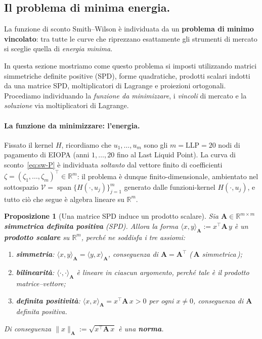 \documentclass[11pt,a4paper]{article}
\theoremstyle{plain}
\newtheorem{proposizione}[teorema]{Proposizione}
\theoremstyle{definition}
\theoremstyle{remark}
\newcommand{\LLP}{\ensuremath{\mathrm{LLP}}}
\newcommand{\transp}{^{\!\top}}
\begin{document}
\subsection{Il problema di minima energia.}
\label{sec:minenergia}

La funzione di sconto Smith--Wilson \`e individuata da un \textbf{problema di minimo
vincolato}: tra tutte le curve che riprezzano esattamente gli strumenti di mercato si
sceglie quella di \emph{energia minima}.

In questa sezione mostriamo come questo problema si imposti utilizzando matrici simmetriche definite positive
(SPD), forme quadratiche, prodotti scalari indotti da una matrice SPD, moltiplicatori di
Lagrange e proiezioni ortogonali. Procediamo individuando la \emph{funzione da minimizzare}, i \emph{vincoli} di mercato
e la \emph{soluzione} via moltiplicatori di Lagrange.

\paragraph{La funzione da minimizzare: l'energia.}
Fissato il kernel $H$, ricordiamo che $u_1,\ldots,u_m$ sono gli $m=\LLP=20$ nodi di
pagamento di EIOPA (anni $1,\ldots,20$ fino al Last Liquid Point). La curva di sconto~\eqref{eq:sw-P}
\`e individuata \emph{soltanto} dal vettore finito di coefficienti $\zeta=(\zeta_1,\ldots,\zeta_m)\transp
\in\mathbb{R}^m$: il problema \`e dunque finito-dimensionale, ambientato nel sottospazio
$\mathcal{V} = \operatorname{span}\{H(\cdot,u_j)\}_{j=1}^{m}$ generato dalle funzioni-kernel
$H(\cdot,u_j)$, e tutto ci\`o che segue \`e algebra lineare su $\mathbb{R}^m$.

\begin{proposizione}[Una matrice SPD induce un prodotto scalare]
\label{oss:spd-prodotto}
Sia $\mathbf{A}\in\mathbb{R}^{m\times m}$ \textbf{simmetrica definita positiva} (SPD).
Allora la forma $\langle x,y\rangle_{\mathbf{A}} := x\transp \mathbf{A}\, y$ \`e un
\textbf{prodotto scalare} su $\mathbb{R}^m$, perch\'e ne soddisfa i tre assiomi:
\begin{enumerate}
  \item \textbf{simmetria}: $\langle x,y\rangle_{\mathbf{A}} = \langle y,x\rangle_{\mathbf{A}}$,
        conseguenza di $\mathbf{A} = \mathbf{A}\transp$ (\,$\mathbf{A}$ \emph{simmetrica}\,);
  \item \textbf{bilinearit\`a}: $\langle \cdot,\cdot\rangle_{\mathbf{A}}$ \`e lineare in
        ciascun argomento, perch\'e tale \`e il prodotto matrice--vettore;
  \item \textbf{definita positivit\`a}: $\langle x,x\rangle_{\mathbf{A}} = x\transp\mathbf{A}\,x > 0$
        per ogni $x\neq 0$, conseguenza di $\mathbf{A}$ \emph{definita positiva}.
\end{enumerate}
Di conseguenza $\|x\|_{\mathbf{A}} := \sqrt{x\transp \mathbf{A}\, x}$ \`e una \textbf{norma}.
\end{proposizione}
\end{document}

